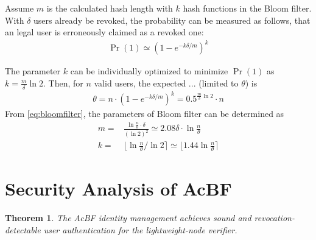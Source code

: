 \documentclass[conference]{IEEEtran}
\newtheorem{theorem}{Theorem}
\begin{document}
Assume $m$ is the calculated hash length with $k$ hash functions in the Bloom filter. With $\delta$ users already be revoked, the probability can be measured as follows, that an legal user is erroneously claimed as a revoked one: 
\begin{align} 
    \Pr(1) \simeq (1 - e^{-k\delta/m})^k 
 \end{align}

The parameter $k$ can be individually optimized to minimize $\Pr(1)$ as $ k = \frac{m}{\delta}\ln 2$. Then, for $n$ valid users, the expected ... (limited to $\theta$) is 
\begin{align}\label{eq:bloomfilter}
    \theta = n \cdot (1 - e^{-k\delta/m})^{k} = 0.5^{\frac{m}{\delta}\ln 2}\cdot n
\end{align}
From \eqref{eq:bloomfilter}, the parameters of Bloom filter can be determined as 
\begin{align}
m = & \frac{\ln \frac{n}{\theta} \cdot \delta}{(\ln 2)^2} \simeq 2.08\delta \cdot\ln \frac{n}{\theta}\\
k = & \lfloor \ln \frac{n}{\theta} / \ln 2 \rceil \simeq \lfloor 1.44 \ln \frac{n}{\theta} \rceil
\end{align}

\section{Security Analysis of AcBF}
\begin{theorem}\label{theo:security}
	The AcBF identity management achieves sound and revocation-detectable user authentication for the lightweight-node verifier.
\end{theorem}
\end{document}
